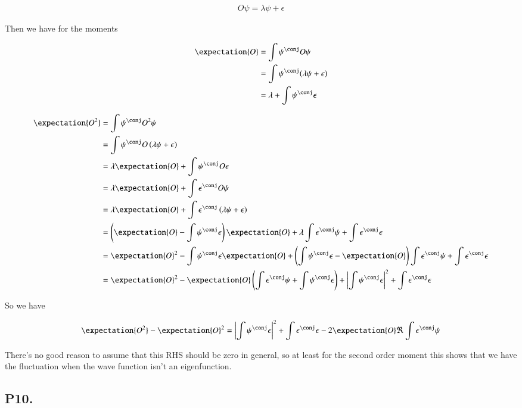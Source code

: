 \begin{align*}
O \psi = \lambda \psi + \epsilon
\end{align*}

Then we have for the moments

\begin{align*}
\expectation{O}
&= \int \psi^\conj O \psi \\
&= \int \psi^\conj ( \lambda \psi + \epsilon ) \\
&= \lambda + \int \psi^\conj \epsilon \\
\end{align*}

\begin{align*}
\expectation{O^2}
&= \int \psi^\conj O^2 \psi \\
&= \int \psi^\conj O \left( \lambda \psi + \epsilon \right) \\
&= \lambda \expectation{O} + \int \psi^\conj O \epsilon \\
&= \lambda \expectation{O} + \int \epsilon^\conj O \psi \\
&= \lambda \expectation{O} + \int \epsilon^\conj \left(\lambda \psi + \epsilon\right) \\
&= \left(\expectation{O} - \int \psi^\conj \epsilon \right)\expectation{O} + 
\lambda \int \epsilon^\conj \psi 
+ \int \epsilon^\conj \epsilon 
\\
&= \expectation{O}^2 - \int \psi^\conj \epsilon \expectation{O} + \left( \int \psi^\conj \epsilon - \expectation{O}\right) \int \epsilon^\conj \psi + \int \epsilon^\conj \epsilon 
\\
&= \expectation{O}^2 
- \expectation{O} \left( \int \epsilon^\conj \psi + \int \psi^\conj \epsilon \right)
+ \Abs{\int \psi^\conj \epsilon}^2
+ \int \epsilon^\conj \epsilon 
\\
\end{align*}

So we have

\begin{align*}
\expectation{O^2} - \expectation{O}^2 
&= 
\Abs{\int \psi^\conj \epsilon}^2 + \int \epsilon^\conj \epsilon - 2 \expectation{O} \Re \int \epsilon^\conj \psi \\
\end{align*}

There's no good reason to assume that this RHS should be zero in general, so at least for the second order moment this shows that we have the fluctuation when the wave
function isn't an eigenfunction.

\subsection{P10. }


